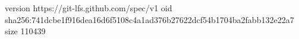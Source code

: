 version https://git-lfs.github.com/spec/v1
oid sha256:741dcbe1f916dea16d6f5108c4a1ad376b27622dcf54b1704ba2fabb132e22a7
size 110439
